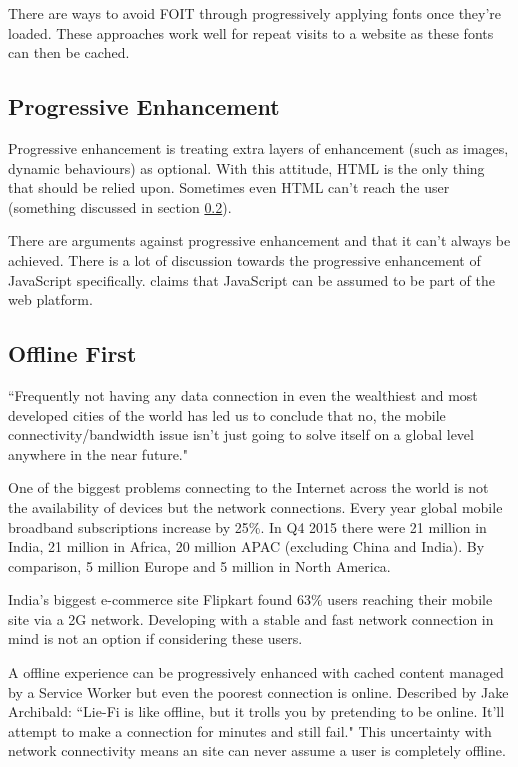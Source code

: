 There are ways to avoid FOIT through progressively applying fonts once they're loaded. These approaches work well for repeat visits to a website as these fonts can then be cached. \cite{FOIT}

\subsection{Progressive Enhancement} \label{l-r--progressive-enhancement}

Progressive enhancement is treating extra layers of enhancement (such as images, dynamic behaviours) as optional. With this attitude, HTML is the only thing that should be relied upon. Sometimes even HTML can't reach the user (something discussed in section \ref{l-r--offline-first}). \cite{progressive_enhancement}

There are arguments against progressive enhancement and that it can't always be achieved. There is a lot of discussion towards the progressive enhancement of JavaScript specifically. \cite{progressive_enhancement_dead} claims that JavaScript can be assumed to be part of the web platform.

\subsection{Offline First} \label{l-r--offline-first}

``Frequently not having any data connection in even the wealthiest and most developed cities of the world has led us to conclude that no, the mobile connectivity/bandwidth issue isn’t just going to solve itself on a global level anywhere in the near future." \cite{hello_to_offline_first}

One of the biggest problems connecting to the Internet across the world is not the availability of devices but the network connections. Every year global mobile broadband subscriptions increase by 25\%. In Q4 2015 there were 21 million in India, 21 million in Africa, 20 million APAC (excluding China and India). By comparison, 5 million Europe and 5 million in North America. \cite{ericsson}

India's biggest e-commerce site Flipkart found 63\% users reaching their mobile site via a 2G network. \cite{flipkart} Developing with a stable and fast network connection in mind is not an option if considering these users.

A offline experience can be progressively enhanced with cached content managed by a Service Worker but even the poorest connection is online. Described by Jake Archibald: ``Lie-Fi is like offline, but it trolls you by pretending to be online. It'll attempt to make a connection for minutes and still fail." \cite{supercharging_page_load} This uncertainty with network connectivity means an site can never assume a user is completely offline.

